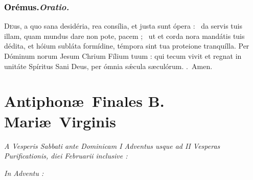 \documentclass[12pt]{article} %
\newenvironment{rubric}{\vspace{2 mm}\color{benred8} \itshape \leftskip 0in \setlength{\parindent}{0.25in}}{\vspace{2 mm}}
\newenvironment{response}{\leftskip 0in \setlength{\parindent}{0in}}{\vspace{2 mm}}
\let\oldgresixstar\gresixstar
\renewcommand{\gresixstar}{\textcolor{benred8}{\oldgresixstar}}
\let\oldgredagger\gredagger
\renewcommand{\gredagger}{\textcolor{benred8}{\oldgredagger}}
\let\oldRbar\Rbar
\renewcommand{\Rbar}{\textcolor{benred8}{\oldRbar .}}
\def\capitulumSpace{\hspace{20 mm}}
\begin{document}
\subsubsection*{\textcolor{black}{Or\'{e}mus.}\capitulumSpace \emph{Oratio.}}

\begin{response}\lettrine{D}{e}us, a quo sana desid\'{e}ria, rea cons\'{i}lia, et justa sunt \'{o}pera : \gredagger\ da servis tuis illam, quam mundus dare non pote, pacem ; \gresixstar\ ut et corda nora mand\'{a}tis tuis d\'{e}dita, et h\'{o}ium subl\'{a}ta form\'{i}dine, t\'{e}mpora sint tua proteione tranqu\'{i}lla. Per D\'{o}minum norum Jesum Chrium F\'{i}lium tuum : qui tecum vivit et regnat in unit\'{a}te Sp\'{i}ritus Sani Deus, per \'{o}mnia s\'{\ae}cula s\ae cul\'{o}rum. \Rbar\ Amen.

\end{response}

\newpage


\section*{Antiphon\ae\ Finales B. Mari\ae\ Virginis}
\label{sec:AntBMV}

\thispagestyle{plain}


\begin{rubric}
\hspace*{25pt}A Vesperis Sabbati ante Dominicam I Adventus usque ad II Vesperas Purificationis, diei Februarii inclusive :

\end{rubric}


\gresetfirstlineaboveinitial{\small \textsc{ \textbf{\textcolor{benred8}{V}}}}{\small \textsc{ \textbf{\textcolor{benred8}{V}}}}

\vspace{2mm}

\begin{rubric}
In Adventu :

\end{rubric}
\end{document}
